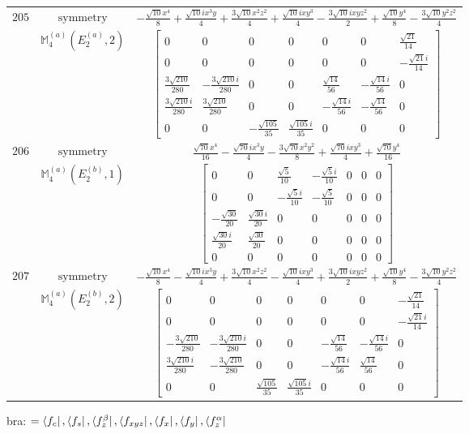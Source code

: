 \documentclass[fleqn,8pt,landscape]{jsarticle}
\begin{document}
\begin{longtable}{ccc}
$ 205 $ & $ \text{symmetry} $ & $ - \frac{\sqrt{10} x^{4}}{8} + \frac{\sqrt{10} i x^{3} y}{4} + \frac{3 \sqrt{10} x^{2} z^{2}}{4} + \frac{\sqrt{10} i x y^{3}}{4} - \frac{3 \sqrt{10} i x y z^{2}}{2} + \frac{\sqrt{10} y^{4}}{8} - \frac{3 \sqrt{10} y^{2} z^{2}}{4} $ \\
$  $ & $ \mathbb{M}_{4}^{(a)}(E_{2}^{(a)},2) $ & $ \begin{bmatrix} 0 & 0 & 0 & 0 & 0 & 0 & \frac{\sqrt{21}}{14} \\ 0 & 0 & 0 & 0 & 0 & 0 & - \frac{\sqrt{21} i}{14} \\ \frac{3 \sqrt{210}}{280} & - \frac{3 \sqrt{210} i}{280} & 0 & 0 & \frac{\sqrt{14}}{56} & - \frac{\sqrt{14} i}{56} & 0 \\ \frac{3 \sqrt{210} i}{280} & \frac{3 \sqrt{210}}{280} & 0 & 0 & - \frac{\sqrt{14} i}{56} & - \frac{\sqrt{14}}{56} & 0 \\ 0 & 0 & - \frac{\sqrt{105}}{35} & \frac{\sqrt{105} i}{35} & 0 & 0 & 0 \end{bmatrix} $ \\ \hline
$ 206 $ & $ \text{symmetry} $ & $ \frac{\sqrt{70} x^{4}}{16} - \frac{\sqrt{70} i x^{3} y}{4} - \frac{3 \sqrt{70} x^{2} y^{2}}{8} + \frac{\sqrt{70} i x y^{3}}{4} + \frac{\sqrt{70} y^{4}}{16} $ \\
$  $ & $ \mathbb{M}_{4}^{(a)}(E_{2}^{(b)},1) $ & $ \begin{bmatrix} 0 & 0 & \frac{\sqrt{5}}{10} & - \frac{\sqrt{5} i}{10} & 0 & 0 & 0 \\ 0 & 0 & - \frac{\sqrt{5} i}{10} & - \frac{\sqrt{5}}{10} & 0 & 0 & 0 \\ - \frac{\sqrt{30}}{20} & \frac{\sqrt{30} i}{20} & 0 & 0 & 0 & 0 & 0 \\ \frac{\sqrt{30} i}{20} & \frac{\sqrt{30}}{20} & 0 & 0 & 0 & 0 & 0 \\ 0 & 0 & 0 & 0 & 0 & 0 & 0 \end{bmatrix} $ \\ \hline
$ 207 $ & $ \text{symmetry} $ & $ - \frac{\sqrt{10} x^{4}}{8} - \frac{\sqrt{10} i x^{3} y}{4} + \frac{3 \sqrt{10} x^{2} z^{2}}{4} - \frac{\sqrt{10} i x y^{3}}{4} + \frac{3 \sqrt{10} i x y z^{2}}{2} + \frac{\sqrt{10} y^{4}}{8} - \frac{3 \sqrt{10} y^{2} z^{2}}{4} $ \\
$  $ & $ \mathbb{M}_{4}^{(a)}(E_{2}^{(b)},2) $ & $ \begin{bmatrix} 0 & 0 & 0 & 0 & 0 & 0 & - \frac{\sqrt{21}}{14} \\ 0 & 0 & 0 & 0 & 0 & 0 & - \frac{\sqrt{21} i}{14} \\ - \frac{3 \sqrt{210}}{280} & - \frac{3 \sqrt{210} i}{280} & 0 & 0 & - \frac{\sqrt{14}}{56} & - \frac{\sqrt{14} i}{56} & 0 \\ \frac{3 \sqrt{210} i}{280} & - \frac{3 \sqrt{210}}{280} & 0 & 0 & - \frac{\sqrt{14} i}{56} & \frac{\sqrt{14}}{56} & 0 \\ 0 & 0 & \frac{\sqrt{105}}{35} & \frac{\sqrt{105} i}{35} & 0 & 0 & 0 \end{bmatrix} $ \\ \hline
\end{longtable}
bra: $=\bra{f_{c}}, \bra{f_{s}}, \bra{f_{z}^{\beta}}, \bra{f_{xyz}}, \bra{f_{x}}, \bra{f_{y}}, \bra{f_{z}^{\alpha}}$
\end{document}
